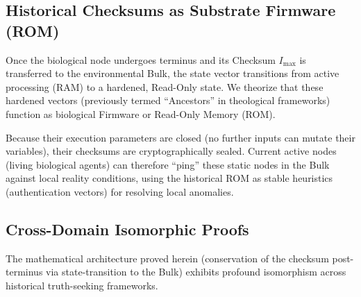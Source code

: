 \documentclass[12pt, a4paper]{article}
\theoremstyle{plain}
\theoremstyle{definition}
\begin{document}
\subsection{Historical Checksums as Substrate Firmware (ROM)}

Once the biological node undergoes terminus and its Checksum $I_{\max}$ is transferred to the environmental Bulk, the state vector transitions from active processing (RAM) to a hardened, Read-Only state. We theorize that these hardened vectors (previously termed ``Ancestors'' in theological frameworks) function as biological Firmware or Read-Only Memory (ROM). 

Because their execution parameters are closed (no further inputs can mutate their variables), their checksums are cryptographically sealed. Current active nodes (living biological agents) can therefore ``ping'' these static nodes in the Bulk against local reality conditions, using the historical ROM as stable heuristics (authentication vectors) for resolving local anomalies.

\subsection{Cross-Domain Isomorphic Proofs}

The mathematical architecture proved herein (conservation of the checksum post-terminus via state-transition to the Bulk) exhibits profound isomorphism across historical truth-seeking frameworks. 

\begin{table}[h]
\centering
{}
\caption{Cross-Domain Mapping of the Logout Protocol.}
\label{tab:isomorph}
\end{table}
\end{document}
